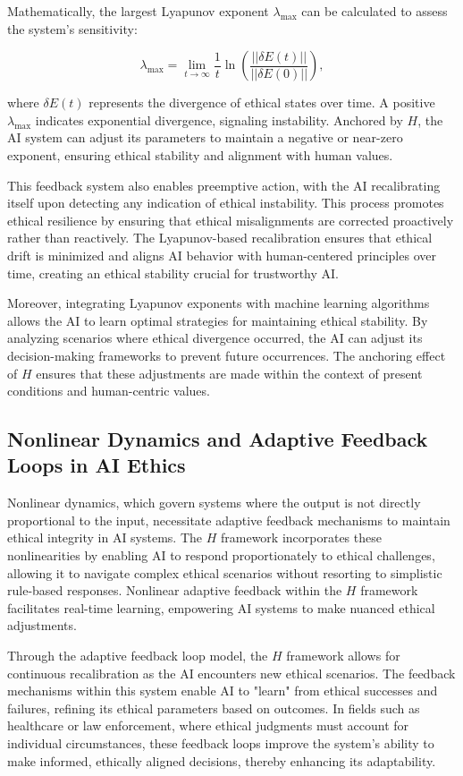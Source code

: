 \documentclass[12pt]{article}
\begin{document}
Mathematically, the largest Lyapunov exponent \(\lambda_{\text{max}}\) can be calculated to assess the system's sensitivity:

\[
\lambda_{\text{max}} = \lim_{t \to \infty} \frac{1}{t} \ln \left( \frac{||\delta E(t)||}{||\delta E(0)||} \right),
\]

where \(\delta E(t)\) represents the divergence of ethical states over time. A positive \(\lambda_{\text{max}}\) indicates exponential divergence, signaling instability. Anchored by \(H\), the AI system can adjust its parameters to maintain a negative or near-zero exponent, ensuring ethical stability and alignment with human values.

This feedback system also enables preemptive action, with the AI recalibrating itself upon detecting any indication of ethical instability. This process promotes ethical resilience by ensuring that ethical misalignments are corrected proactively rather than reactively. The Lyapunov-based recalibration ensures that ethical drift is minimized and aligns AI behavior with human-centered principles over time, creating an ethical stability crucial for trustworthy AI.

Moreover, integrating Lyapunov exponents with machine learning algorithms allows the AI to learn optimal strategies for maintaining ethical stability. By analyzing scenarios where ethical divergence occurred, the AI can adjust its decision-making frameworks to prevent future occurrences. The anchoring effect of \(H\) ensures that these adjustments are made within the context of present conditions and human-centric values.

\subsection{Nonlinear Dynamics and Adaptive Feedback Loops in AI Ethics}
Nonlinear dynamics, which govern systems where the output is not directly proportional to the input, necessitate adaptive feedback mechanisms to maintain ethical integrity in AI systems. The \(H\) framework incorporates these nonlinearities by enabling AI to respond proportionately to ethical challenges, allowing it to navigate complex ethical scenarios without resorting to simplistic rule-based responses. Nonlinear adaptive feedback within the \(H\) framework facilitates real-time learning, empowering AI systems to make nuanced ethical adjustments.

Through the adaptive feedback loop model, the \(H\) framework allows for continuous recalibration as the AI encounters new ethical scenarios. The feedback mechanisms within this system enable AI to "learn" from ethical successes and failures, refining its ethical parameters based on outcomes. In fields such as healthcare or law enforcement, where ethical judgments must account for individual circumstances, these feedback loops improve the system's ability to make informed, ethically aligned decisions, thereby enhancing its adaptability.
\end{document}
